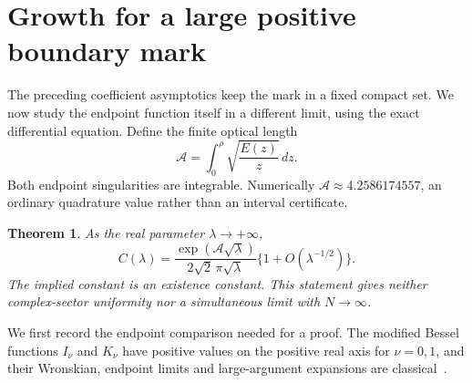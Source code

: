 \documentclass[11pt,letterpaper]{article}
\newtheorem{theorem}{Theorem}[section]
\theoremstyle{remark}\newtheorem{remark}[theorem]{Remark}
\begin{document}
\section{Growth for a large positive boundary mark}\label{men:sec:largemark}
The preceding coefficient asymptotics keep the mark in a fixed compact set. We now study the endpoint function itself in a different limit, using the exact differential equation. Define the finite optical length
\begin{equation}\label{men:eq:optical}
 \mathcal A=\int_0^\rho\sqrt{\frac{E(z)}z}\,dz.
\end{equation}
Both endpoint singularities are integrable. Numerically $\mathcal A\approx4.2586174557$, an ordinary quadrature value rather than an interval certificate.

\begin{theorem}\label{men:thm:largemark}
As the real parameter $\lambda\to+\infty$,
\begin{equation}\label{men:eq:largemark}
 C(\lambda)=\frac{\exp(\mathcal A\sqrt\lambda)}{2\sqrt2\,\pi\sqrt\lambda}
                 \{1+O(\lambda^{-1/2})\}.
\end{equation}
The implied constant is an existence constant. This statement gives neither complex-sector uniformity nor a simultaneous limit with $N\to\infty$.
\end{theorem}

We first record the endpoint comparison needed for a proof. The modified Bessel functions $I_\nu$ and $K_\nu$ have positive values on the positive real axis for $\nu=0,1$, and their Wronskian, endpoint limits and large-argument expansions are classical~\cite{dlmf}.
\end{document}

